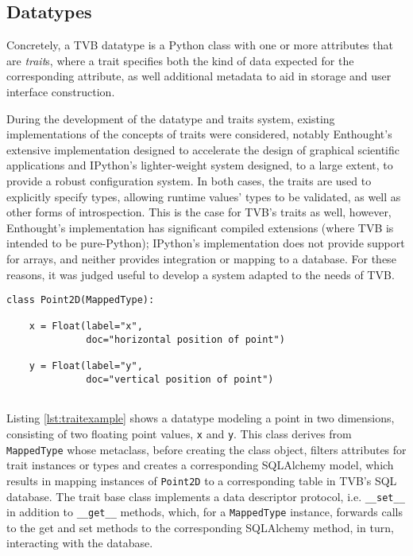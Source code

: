 \documentclass{bioinfo}
\begin{document}
\subsection{Datatypes}

Concretely, a TVB datatype is a Python class with one or more attributes 
that are \textit{trait}s, where a trait specifies both the kind of data
expected for the corresponding attribute, as well additional metadata to
aid in storage and user interface construction. 

During the development of the datatype and traits system, existing implementations
of the concepts of traits were considered, notably Enthought's extensive 
implementation designed to accelerate the design of graphical scientific 
applications and IPython's lighter-weight system designed, to a large extent, 
to provide a robust configuration system. In both cases, the traits are used
to explicitly specify types, allowing runtime values' types to be validated, 
as well as other forms of introspection. This is the case for TVB's traits 
as well, however, Enthought's implementation has significant compiled extensions
(where TVB is intended to be pure-Python); IPython's implementation does not
provide support for arrays, and neither provides integration or mapping to a
database. For these reasons, it was judged useful to develop a system adapted 
to the needs of TVB. 

\begin{lstlisting}[caption={Trait and datatype example}, label={lst:traitexample}]
class Point2D(MappedType):

    x = Float(label="x",
              doc="horizontal position of point")

    y = Float(label="y",
              doc="vertical position of point")
	      
\end{lstlisting}

Listing \ref{lst:traitexample} shows a datatype modeling a point in two 
dimensions, consisting of two floating point values, \texttt{x} and 
\texttt{y}. This class derives from \texttt{MappedType} whose metaclass, 
before creating the class object, filters attributes for trait instances 
or types and creates a corresponding SQLAlchemy model, which results 
in mapping instances of \texttt{Point2D} to a corresponding table in TVB's
SQL database. The trait base class implements a data descriptor protocol,
i.e. \texttt{\_\_set\_\_} in addition to \texttt{\_\_get\_\_} methods, which, for a
\texttt{MappedType} instance, forwards calls to the get and set methods to 
the corresponding SQLAlchemy method, in turn, interacting with the database.
\end{document}

